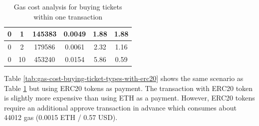 \begin{table}[ht]
\begin{tabular}{|c|c|c|c|c|c|}
{ 0}                                                                    & { 1}                                                               & { 145383}                                                       & { 0.0049}                                                        & { 1.88}                                                          & { 1.88}                                                                          \\ \hline
{ 0}                                                                    & { 2}                                                               & { 179586}                                                       & { 0.0061}                                                        & { 2.32}                                                          & { 1.16}                                                                          \\ \hline
{ 0}                                                                    & { 10}                                                              & { 453240}                                                       & { 0.0154}                                                        & { 5.86}                                                          & { 0.59}                                                                          \\ \hline
\end{tabular}

\caption{Gas cost analysis for buying tickets within one transaction}
\label{tab:gas-cost-buying-ticket-types}
\end{table}


Table \ref{tab:gas-cost-buying-ticket-types-with-erc20} shows the same scenario as Table \ref{tab:gas-cost-buying-ticket-types} but using ERC20 tokens as payment. The transaction with ERC20 token is slightly more expensive than using ETH as a payment. However, ERC20 tokens require an additional approve transaction in advance which consumes about 44012 gas (0.0015 ETH / 0.57 USD). 

